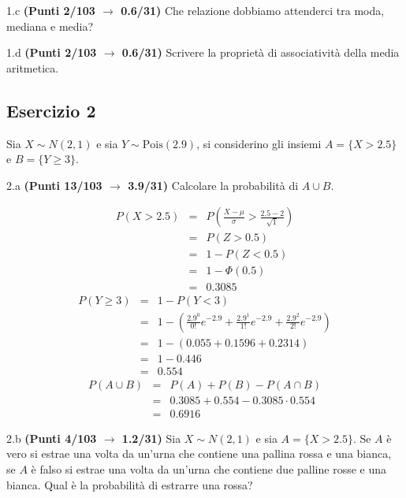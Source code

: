 \documentclass[
  11pt,
]{book}
\theoremstyle{mytheoremstyle}
\theoremstyle{mydefstyle}
\newenvironment{sol}
  {
  \begin{tcolorbox}[enhanced,breakable,arc=0.1mm,boxrule=1pt,colback=white,colframe=iblue,
  title=\bf \fontfamily{lmss}\selectfont \hspace{.5 cm} Soluzione,drop fuzzy shadow]

}{
\end{tcolorbox}
  }
\begin{document}
1.c \textbf{(Punti 2/103 \(\rightarrow\) 0.6/31)} Che relazione dobbiamo attenderci tra moda, mediana e media?

1.d \textbf{(Punti 2/103 \(\rightarrow\) 0.6/31)} Scrivere la proprietà di associatività della media aritmetica.

\subsection{Esercizio 2}\label{esercizio-2-30}

Sia \(X\sim N(2,1)\) e sia \(Y\sim\text{Pois}(2.9)\), si considerino gli insiemi
\(A=\{X>2.5\}\) e \(B=\{Y\geq 3\}\).

2.a \textbf{(Punti 13/103 \(\rightarrow\) 3.9/31)} Calcolare la probabilità di \(A\cup B\).

\begin{sol}
\begin{eqnarray*}
      P( X   >   2.5 ) 
        &=& P\left(  \frac { X  -  \mu }{ \sigma }  >  \frac { 2.5  -  2 }{\sqrt{ 1 }} \right)  \\
                 &=& P\left(  Z   >   0.5 \right) \\    &=& 1-P(Z< 0.5 )\\ 
                 &=&  1-\Phi( 0.5 ) \\ &=&  0.3085 
      \end{eqnarray*}\begin{eqnarray*}
   P( Y \geq 3 ) &=& 1-P( Y < 3 ) \\                 &=& 1-\left( \frac{ 2.9 ^{ 0 }}{ 0 !}e^{- 2.9 }+\frac{ 2.9 ^{ 1 }}{ 1 !}e^{- 2.9 }+\frac{ 2.9 ^{ 2 }}{ 2 !}e^{- 2.9 } \right)\\                 &=& 1-( 0.055+0.1596+0.2314 )\\                 &=& 1- 0.446 \\                 &=&   0.554 
\end{eqnarray*}
\begin{eqnarray*}
  P(A\cup B) &=&  P(A)+P(B)-P(A\cap B)\\
  &=& 0.3085+0.554-0.3085\cdot0.554\\
  &=& 0.6916
\end{eqnarray*}

\end{sol}

2.b \textbf{(Punti 4/103 \(\rightarrow\) 1.2/31)} Sia \(X\sim N(2,1)\) e sia \(A=\{X>2.5\}\).
Se \(A\) è vero si estrae una volta da un'urna che contiene una pallina rossa e una bianca,
se \(A\) è falso si estrae una volta da un'urna che contiene due palline rosse e una bianca.
Qual è la probabilità di estrarre una rossa?
\end{document}
